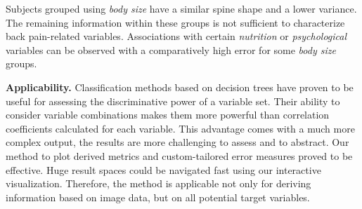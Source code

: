\documentclass[a4paper,twoside]{style/article}
\begin{document}
Subjects grouped using \emph{body size} have a similar spine shape and a lower variance.
The remaining information within these groups is not sufficient to characterize back pain-related variables.
Associations with certain \emph{nutrition} or \emph{psychological} variables can be observed with a comparatively high error for some \emph{body size} groups.

\noindent \textbf{Applicability.}
Classification methods based on decision trees have proven to be useful for assessing the discriminative power of a variable set.
Their ability to consider variable combinations makes them more powerful than correlation coefficients calculated for each variable.
This advantage comes with a much more complex output, the results are more challenging to assess and to abstract.
Our method to plot derived metrics and custom-tailored error measures proved to be effective.
Huge result spaces could be navigated fast using our interactive visualization.
Therefore, the method is applicable not only for deriving information based on image data, but on all potential target variables.
\end{document}
